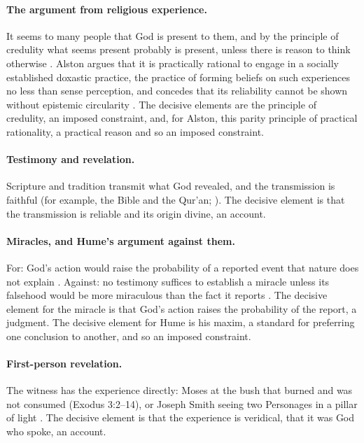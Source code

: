 \paragraph{The argument from religious experience.} It seems to many people that God is present to
them, and by the principle of credulity what seems present probably is present, unless there is
reason to think otherwise \citep{swinburne2004}. Alston argues that it is practically rational to
engage in a socially established doxastic practice, the practice of forming beliefs on such
experiences no less than sense perception, and concedes that its reliability cannot be shown
without epistemic circularity \citep{alston1991}. The decisive elements are the principle of
credulity, an imposed constraint, and, for Alston, this parity principle of practical rationality,
a practical reason and so an imposed constraint.

\paragraph{Testimony and revelation.} Scripture and tradition transmit what God revealed, and the
transmission is faithful (for example, the Bible and the Qur'an; \citealp{bible,quran}). The
decisive element is that the transmission is reliable and its origin divine, an account.

\paragraph{Miracles, and Hume's argument against them.} For: God's action would raise the
probability of a reported event that nature does not explain \citep{swinburne2004}. Against: no
testimony suffices to establish a miracle unless its falsehood would be more miraculous than the
fact it reports \citep[§10.13]{hume1748}. The decisive element for the miracle is that God's action
raises the probability of the report, a judgment. The decisive element for Hume is his maxim, a
standard for preferring one conclusion to another, and so an imposed constraint.

\paragraph{First-person revelation.} The witness has the experience directly: Moses at the bush that
burned and was not consumed (Exodus 3:2--14), or Joseph Smith seeing two Personages in a pillar of
light \citep[1:16--17]{jsh1838}. The decisive element is that the experience is veridical, that it
was God who spoke, an account.

